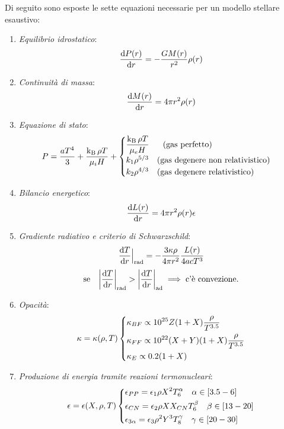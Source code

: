 Di seguito sono esposte le sette equazioni necessarie per un modello stellare esaustivo:
\begin{enumerate}
    \item \emph{Equilibrio idrostatico}:
    \[
    \dfrac{\mathop{\mathrm{{}d}}\mathopen{} P(r)}{\mathop{\mathrm{{}d}}\mathopen{} r} = -\dfrac{G M(r)}{r^2} \rho(r)
    \]
    \item \emph{Continuità di massa}:
    \[
    \dfrac{\mathop{\mathrm{{}d}}\mathopen{} M(r)}{\mathop{\mathrm{{}d}}\mathopen{} r} = 4 \pi r^2 \rho(r)
    \]
    \item \emph{Equazione di stato}:
    \[
        P = \dfrac{aT^4}{3} + \dfrac{\operatorname{k_B} \rho T}{\mu_i H} + 
        \begin{cases} 
        \dfrac{\operatorname{k_B} \rho T}{\mu_e H} \quad \, \, \, \,   \textup{(gas perfetto)} \\ 
        k_1 \rho^{5/3} \quad \textup{(gas degenere non relativistico)} \\ 
        k_2 \rho^{4/3} \quad \textup{(gas degenere relativistico)}
        \end{cases}
    \]
    \item \emph{Bilancio energetico}:
    \[
    \dfrac{\mathop{\mathrm{{}d}}\mathopen{} L(r)}{\mathop{\mathrm{{}d}}\mathopen{} r} = 4 \pi r^2 \rho(r) \epsilon
    \]
    \item \emph{Gradiente radiativo e criterio di Schwarzschild}:
    \[
    \dfrac{\mathop{\mathrm{{}d}}\mathopen{} T}{\mathop{\mathrm{{}d}}\mathopen{} r}\Big|_\textup{rad} = - \dfrac{3 \kappa \rho}{4 \pi r^2} \dfrac{L(r)}{4 a c T^3}
    \]
    \[
    \text{se} \quad \abs*{\dfrac{\ud T}{\ud r}}_\textup{rad} > \abs*{\dfrac{\ud T}{\ud r}}_\textup{ad} \implies \text{c'è convezione.}
    \]
    \item \emph{Opacità}:
    \[
    \kappa = \kappa(\rho, T) 
    \begin{dcases} 
    \kappa_{BF} \propto 10^{25} Z(1 + X) \frac{\rho}{T^{3.5}} \\ 
    \kappa_{FF} \propto 10^{22} (X+Y)(1+X) \frac{\rho}{T^{3.5}} \\ 
    \kappa_{E} \propto 0.2 (1+X) \\ 
    \end{dcases}
    \]
    \item \emph{Produzione di energia tramite reazioni termonucleari}:
    \[
    \epsilon = \epsilon(X, \rho, T) 
    \begin{dcases} \epsilon_{PP} = \epsilon_1 \rho X^2 T_6^\alpha \quad \alpha \in [3.5 - 6] \\ 
    \epsilon_{CN} = \epsilon_2 \rho X X_{CN} T_6^\beta \quad \beta \in [13 - 20] \\ 
    \epsilon_{3\alpha} = \epsilon_3 \rho^2 Y^3 T_8^\gamma \quad \gamma \in [20 - 30] \\
    \end{dcases}
    \]
\end{enumerate}